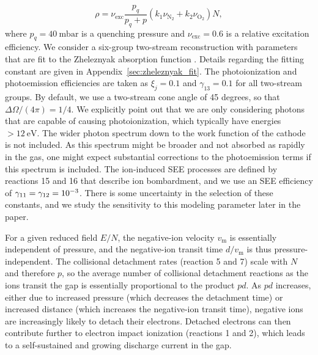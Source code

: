 \documentclass{iopjournal}
\newcommand{\m}{\ensuremath{\text{m}}}
\providecommand\Ntwo{\ensuremath{\textrm{N}_2}}
\providecommand\Otwo{\ensuremath{\textrm{O}_2}}
\begin{document}
\begin{equation}
  \label{eq:photogeneration}
  \rho = \nu_{\text{exc}}\frac{p_q}{p_q + p}\left(k_1\nu_{\Ntwo} + k_2\nu_{\Otwo}\right)N,
\end{equation}
where $p_q = \SI{40}{\milli\bar}$ is a quenching pressure and $\nu_{\text{exc}}=0.6$ is a relative excitation efficiency.
We consider a six-group two-stream reconstruction with parameters that are fit to the Zheleznyak absorption function \cite{1982TepVT..20..423Z,Liu2004,Bourdon2007}.
Details regarding the fitting constant are given in Appendix~\ref{sec:zheleznyak_fit}.
The photoionization and photoemission efficiencies are taken as $\xi_j = 0.1$ and $\gamma_{13}=0.1$ for all two-stream groups.
By default, we use a two-stream cone angle of 45 degrees, so that $\Delta\Omega/(4\pi) = 1/4$.
We explicitly point out that we are only considering photons that are capable of causing photoionization, which typically have energies $>\SI{12}{\electronvolt}$.
The wider photon spectrum down to the work function of the cathode is not included.
As this spectrum might be broader and not absorbed as rapidly in the gas, one might expect substantial corrections to the photoemission terms if this spectrum is included.
The ion-induced SEE processes are defined by reactions 15 and 16 that describe ion bombardment, and we use an SEE efficiency of $\gamma_{11} = \gamma_{12} = \num{E-3}$.
There is some uncertainty in the selection of these constants, and we study the sensitivity to this modeling parameter later in the paper.

For a given reduced field $E/N$, the negative-ion velocity $v_\m$ is essentially independent of pressure, and the negative-ion transit time $d/v_\m$ is thus pressure-independent.
The collisional detachment rates (reaction 5 and 7) scale with $N$ and therefore $p$, so the average number of collisional detachment reactions as the ions transit the gap is essentially proportional to the product $pd$.
As $pd$ increases, either due to increased pressure (which decreases the detachment time) or increased distance (which increases the negative-ion transit time), negative ions are increasingly likely to detach their electrons.
Detached electrons can then contribute further to electron impact ionization (reactions 1 and 2), which leads to a self-sustained and growing discharge current in the gap.

\end{document}
